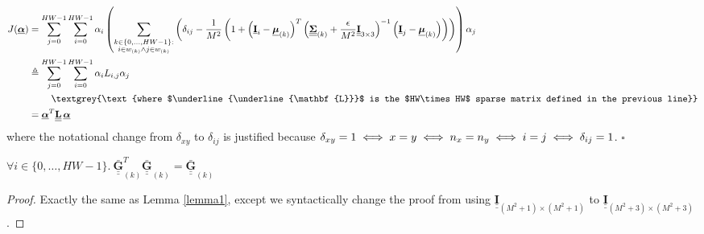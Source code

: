 \documentclass{article}
\def\vt#1{\underline{\mathbf{#1}}}
\def\vts#1{\underline{\boldsymbol{#1}}}
\def\mt#1{\underline{\underline{\mathbf{#1}}}}
\def\mts#1{\underline{\underline{\boldsymbol{#1}}}}
\begin{document}
\begin{align*}
    J(\vts\alpha) &= \sum_{j=0}^{HW-1} \sum_{i=0}^{HW-1} \alpha_i \left(\sum_{\substack{k\in\{0,\dots,HW-1\}:\\i\in w_{(k)}\wedge j\in w_{(k)}}} \left( \delta_{ij} - \frac1{M^2}\left(1 + \left(\vt{I}_{i} - \vts \mu_{(k)}\right)^T \left(\mts \Sigma_{(k)} + \frac\epsilon{M^2} \mt{I}_{3\times 3}\right)^{-1} \left(\vt{I}_{j} - \vts \mu_{(k)}\right) \right) \right)\right) \alpha_j\\
    &\triangleq \sum_{j=0}^{HW-1} \sum_{i=0}^{HW-1} \alpha_i L_{i,j} \alpha_j\\
    &\quad\quad\ \textgrey{\text{where $\mt L$ is the $HW\times HW$ sparse matrix defined in the previous line}}\\
    &= \vts \alpha^T \mt L\, \vts \alpha
\end{align*}
where the notational change from $\delta_{xy}$ to $\delta_{ij}$ is justified because $\delta_{xy} = 1 \iff x=y \iff n_x = n_y \iff i = j\\ \iff \delta_{ij}=1$. \hfill$\square$


\begin{lemma}\label{lemma3}
    $\forall i\in\{0,\dots,HW-1\}.\ \mt{\bar{G}}_{(k)}^T \mt{\bar{G}}_{(k)} = \mt{\bar{G}}_{(k)}$
    \begin{proof}
        Exactly the same as Lemma \ref{lemma1}, except we syntactically change the proof from using $\mt I_{(M^2+1)\times(M^2+1)}$ to $\mt I_{(M^2+3)\times(M^2+3)}$.
    \end{proof}
\end{lemma}
\end{document}

